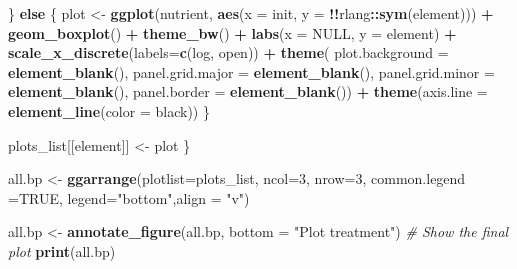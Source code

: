 \documentclass[
]{article}
\newenvironment{Shaded}{\begin{snugshade}}{\end{snugshade}}
\newcommand{\AttributeTok}[1]{\textcolor[rgb]{0.13,0.29,0.53}{#1}}
\newcommand{\CommentTok}[1]{\textcolor[rgb]{0.56,0.35,0.01}{\textit{#1}}}
\newcommand{\ConstantTok}[1]{\textcolor[rgb]{0.56,0.35,0.01}{#1}}
\newcommand{\ControlFlowTok}[1]{\textcolor[rgb]{0.13,0.29,0.53}{\textbf{#1}}}
\newcommand{\DecValTok}[1]{\textcolor[rgb]{0.00,0.00,0.81}{#1}}
\newcommand{\FunctionTok}[1]{\textcolor[rgb]{0.13,0.29,0.53}{\textbf{#1}}}
\newcommand{\NormalTok}[1]{#1}
\newcommand{\OtherTok}[1]{\textcolor[rgb]{0.56,0.35,0.01}{#1}}
\newcommand{\SpecialCharTok}[1]{\textcolor[rgb]{0.81,0.36,0.00}{\textbf{#1}}}
\newcommand{\StringTok}[1]{\textcolor[rgb]{0.31,0.60,0.02}{#1}}
\begin{document}
\begin{Shaded}
\begin{Highlighting}[]
\NormalTok{  \} }\ControlFlowTok{else}\NormalTok{ \{}
\NormalTok{    plot }\OtherTok{\textless{}{-}} \FunctionTok{ggplot}\NormalTok{(nutrient, }\FunctionTok{aes}\NormalTok{(}\AttributeTok{x =}\NormalTok{ init, }\AttributeTok{y =} \SpecialCharTok{!!}\NormalTok{rlang}\SpecialCharTok{::}\FunctionTok{sym}\NormalTok{(element))) }\SpecialCharTok{+}
      \FunctionTok{geom\_boxplot}\NormalTok{() }\SpecialCharTok{+} 
      \FunctionTok{theme\_bw}\NormalTok{() }\SpecialCharTok{+}
      \FunctionTok{labs}\NormalTok{(}\AttributeTok{x =} \ConstantTok{NULL}\NormalTok{, }\AttributeTok{y =}\NormalTok{ element) }\SpecialCharTok{+} 
      \FunctionTok{scale\_x\_discrete}\NormalTok{(}\AttributeTok{labels=}\FunctionTok{c}\NormalTok{(}\StringTok{\textquotesingle{}log\textquotesingle{}}\NormalTok{, }\StringTok{\textquotesingle{}open\textquotesingle{}}\NormalTok{)) }\SpecialCharTok{+}
      \FunctionTok{theme}\NormalTok{(}
    \AttributeTok{plot.background =} \FunctionTok{element\_blank}\NormalTok{(),}
    \AttributeTok{panel.grid.major =} \FunctionTok{element\_blank}\NormalTok{(),}
    \AttributeTok{panel.grid.minor =} \FunctionTok{element\_blank}\NormalTok{(),}
    \AttributeTok{panel.border =} \FunctionTok{element\_blank}\NormalTok{()) }\SpecialCharTok{+} \FunctionTok{theme}\NormalTok{(}\AttributeTok{axis.line =} \FunctionTok{element\_line}\NormalTok{(}\AttributeTok{color =} \StringTok{\textquotesingle{}black\textquotesingle{}}\NormalTok{))}
\NormalTok{  \}}
  
\NormalTok{  plots\_list[[element]] }\OtherTok{\textless{}{-}}\NormalTok{ plot}
\NormalTok{\}}

\NormalTok{all.bp }\OtherTok{\textless{}{-}} \FunctionTok{ggarrange}\NormalTok{(}\AttributeTok{plotlist=}\NormalTok{plots\_list, }\AttributeTok{ncol=}\DecValTok{3}\NormalTok{, }\AttributeTok{nrow=}\DecValTok{3}\NormalTok{, }\AttributeTok{common.legend =}\ConstantTok{TRUE}\NormalTok{, }\AttributeTok{legend=}\StringTok{"bottom"}\NormalTok{,}\AttributeTok{align =} \StringTok{"v"}\NormalTok{)}

\NormalTok{all.bp }\OtherTok{\textless{}{-}} \FunctionTok{annotate\_figure}\NormalTok{(all.bp, }\AttributeTok{bottom =} \StringTok{"Plot treatment"}\NormalTok{)}
\CommentTok{\# Show the final plot}
\FunctionTok{print}\NormalTok{(all.bp)}
\end{Highlighting}
\end{Shaded}
\end{document}
